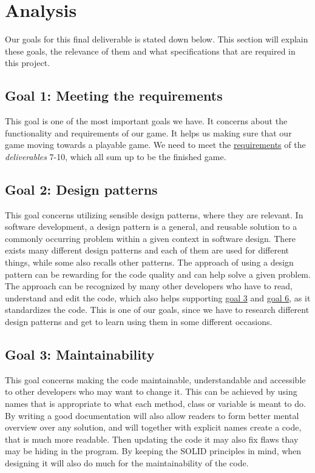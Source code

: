 \documentclass[../master.tex]{subfile}
\begin{document}
\section{Analysis}
Our goals for this final deliverable is stated down below. This section will explain these goals, the relevance of them and what specifications that are required in this project.
\label{sec:Goals}

\subsection*{Goal 1: Meeting the requirements}
\label{sec:Goal1}
This goal is one of the most important goals we have. It concerns about the functionality and requirements of our game. It helps us making sure that our game moving towards a playable game. We need to meet the \hyperref[sec:Requirements]{requirements} of the \textit{deliverables} 7-10, which all sum up to be the finished game.

\subsection*{Goal 2: Design patterns}
This goal concerns utilizing sensible design patterns, where they are relevant. In software development, a design pattern is a general, and reusable solution to a commonly occurring problem within a given context in software design. There exists many different design patterns and each of them are used for different things, while some also recalls other patterns. The approach of using a design pattern can be rewarding for the code quality and can help solve a given problem. The approach can be recognized by many other developers who have to read, understand and edit the code, which also helps supporting \hyperref[sec:Goal3]{goal 3} and \hyperref[sec:Goal6]{goal 6}, as it standardizes the code. This is one of our goals, since we have to research different design patterns and get to learn using them in some different occasions.

\subsection*{Goal 3: Maintainability}
\label{sec:Goal3}
This goal concerns making the code maintainable, understandable and accessible to other developers who may want to change it. This can be achieved by using names that is appropriate to what each method, class or variable is meant to do. By writing a good documentation will also allow readers to form better mental overview over any solution, and will together with explicit names create a code, that is much more readable. Then updating the code it may also fix flaws thay may be hiding in the program. By keeping the SOLID principles in mind, when designing it will also do much for the maintainability of the code.\\
\end{document}
